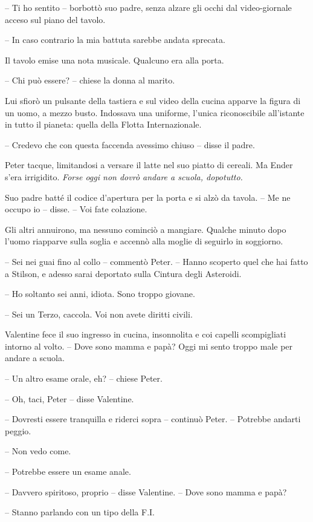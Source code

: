 {-- Ti ho sentito -- borbottò suo padre, senza alzare gli occhi dal
	video-giornale acceso sul piano del tavolo.}

{-- In caso contrario la mia battuta sarebbe andata sprecata.}

{Il tavolo emise una nota musicale. Qualcuno era alla porta.}

{-- Chi può essere? -- chiese la donna al marito.}

{Lui sfiorò un pulsante della tastiera e sul video della cucina apparve
	la figura di un uomo, a mezzo busto. Indossava una uniforme, l'unica
	riconoscibile all'istante in tutto il pianeta: quella della Flotta
	Internazionale.}

{-- Credevo che con questa faccenda avessimo chiuso -- disse il padre.}

{Peter tacque, limitandosi a versare il latte nel suo piatto di cereali.
	Ma Ender s'era irrigidito. \emph{Forse oggi non dovrò andare a scuola,
		dopotutto.}}

{Suo padre batté il codice d'apertura per la porta e si alzò da tavola.
	-- Me ne occupo io -- disse. -- Voi fate colazione.}

{Gli altri annuirono, ma nessuno cominciò a mangiare. Qualche minuto
	dopo l'uomo riapparve sulla soglia e accennò alla moglie di seguirlo in
	soggiorno.}

{-- Sei nei guai fino al collo -- commentò Peter. -- Hanno scoperto quel
	che hai fatto a Stilson, e adesso sarai deportato sulla Cintura degli
	Asteroidi.}

{-- Ho soltanto sei anni, idiota. Sono troppo giovane.}

{-- Sei un Terzo, caccola. Voi non avete diritti civili.}

{Valentine fece il suo ingresso in cucina, insonnolita e coi capelli
	scompigliati intorno al volto. -- Dove sono mamma e papà? Oggi mi sento
	troppo male per andare a scuola.}

{-- Un altro esame orale, eh? -- chiese Peter.}

{-- Oh, taci, Peter -- disse Valentine.}

{-- Dovresti essere tranquilla e riderci sopra -- continuò Peter. --
	Potrebbe andarti peggio.}

{-- Non vedo come.}

{-- Potrebbe essere un esame anale.}

{-- Davvero spiritoso, proprio -- disse Valentine. -- Dove sono mamma e
	papà?}

{-- Stanno parlando con un tipo della F.I.}

